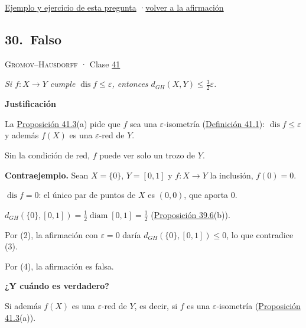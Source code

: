 \documentclass[11pt,a4paper]{article}
\DeclareMathOperator{\diam}{diam}\DeclareMathOperator{\dis}{dis}\DeclareMathOperator{\dist}{dist}
\newcommand{\bloque}[1]{\par\smallskip\noindent\textbf{\color{acento}#1}\par}
\begin{document}
\par{}
\par{\small \hyperlink{e-29}{Ejemplo y ejercicio de esta pregunta} \quad·\quad \hyperlink{q-29}{volver a la afirmación}}
\subsection*{\hypertarget{r-30}{}30.\ \textcolor{bad}{Falso}}
{\small \textsc{Gromov–Hausdorff} · Clase \href{https://decostruttivismo.github.io/MAT2514-repaso/pdf/MAT2514_apuntes_completos.pdf\#nameddest=section.41}{41}}\par
\emph{Si $f\colon X\to Y$ cumple $\dis f\le\varepsilon$, entonces $d_{GH}(X,Y)\le\frac32\varepsilon$.}
\bloque{Justificación}
\begin{pasos}
\item[(1)] La \href{https://decostruttivismo.github.io/MAT2514-repaso/pdf/MAT2514_apuntes_completos.pdf\#nameddest=teorema.41.3}{Proposición 41.3}(a) pide que $f$ sea una $\varepsilon$-isometría (\href{https://decostruttivismo.github.io/MAT2514-repaso/pdf/MAT2514_apuntes_completos.pdf\#nameddest=teorema.41.1}{Definición 41.1}): $\dis f\le\varepsilon$ y además $f(X)$ es una $\varepsilon$-red de $Y$.
\item[] Sin la condición de red, $f$ puede ver solo un trozo de $Y$.
\item[] \textbf{Contraejemplo.} Sean $X=\{0\}$, $Y=[0,1]$ y $f\colon X\to Y$ la inclusión, $f(0)=0$.
\item[(2)] $\dis f=0$: el único par de puntos de $X$ es $(0,0)$, que aporta $0$.
\item[(3)] $d_{GH}(\{0\},[0,1])=\frac12\diam[0,1]=\frac12$ (\href{https://decostruttivismo.github.io/MAT2514-repaso/pdf/MAT2514_apuntes_completos.pdf\#nameddest=teorema.39.6}{Proposición 39.6}(b)).
\item[(4)] Por (2), la afirmación con $\varepsilon=0$ daría $d_{GH}(\{0\},[0,1])\le0$, lo que contradice (3).
\item[] Por (4), la afirmación es falsa.
\end{pasos}
\bloque{¿Y cuándo es verdadero?}
\begin{pasos}
\item[] Si además $f(X)$ es una $\varepsilon$-red de $Y$, es decir, si $f$ es una $\varepsilon$-isometría (\href{https://decostruttivismo.github.io/MAT2514-repaso/pdf/MAT2514_apuntes_completos.pdf\#nameddest=teorema.41.3}{Proposición 41.3}(a)).
\end{pasos}
\end{document}
